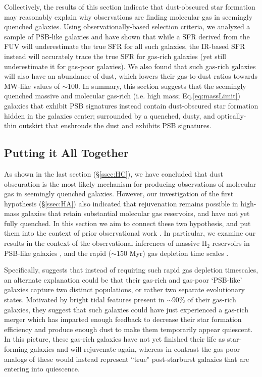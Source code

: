 \documentclass[twocolumn, linenumbers]{aastex631}
\newcommand{\eq}{Eq.\hspace{.2em}}
\begin{document}
Collectively, the results of this section indicate that dust-obscured star formation may reasonably explain why observations are finding molecular gas in seemingly quenched galaxies.  Using observationally-based selection criteria, we analyzed a sample of PSB-like galaxies and have shown that while a SFR derived from the FUV will underestimate the true SFR for all such galaxies, the IR-based SFR instead will accurately trace the true SFR for gas-rich galaxies (yet still underestimate it for gas-poor galaxies).  We also found that such gas-rich galaxies will also have an abundance of dust, which lowers their gas-to-dust ratios towards MW-like values of $\sim 100$.  In summary, this section suggests that the seemingly quenched massive and molecular gas-rich (i.e. high mass; \eq \ref{eq:massLimit}) galaxies that exhibit PSB signatures instead contain dust-obscured star formation hidden in the galaxies center; surrounded by a quenched, dusty, and optically-thin outskirt that enshrouds the dust and exhibits PSB signatures.

\subsection{Putting it All Together}
\label{ssec:allTogether}
As shown in the last section (\S\ref{ssec:HC}), we have concluded that dust obscuration is the most likely mechanism for producing observations of molecular gas in seemingly quenched galaxies.  However, our investigation of the first hypothesis (\S\ref{ssec:HA}) also indicated that rejuvenation remains possible in high-mass galaxies that retain substantial molecular gas reservoirs, and have not yet fully quenched.  In this section we aim to connect these two hypothesis, and put them into the context of prior observational work  \citep{French_2018,Bezanson_2022,setton2025}.  In particular, we examine our results in the context of the observational inferences of massive H$_2$ reservoirs in PSB-like galaxies \citep{suess_2017}, and the rapid ($\sim150$ Myr) gas depletion time scales \citep{Bezanson_2022}.  

Specifically, \cite{setton2025} suggests that instead of requiring such rapid gas depletion timescales, an alternate explanation could be that their gas-rich and gas-poor `PSB-like' galaxies capture two distinct populations, or rather two separate evolutionary states.  Motivated by bright tidal features present in $\sim90\%$ of their gas-rich galaxies, they suggest that such galaxies could have just experienced a gas-rich merger which has imparted enough feedback to decrease their star formation efficiency and produce enough dust to make them temporarily appear quiescent.  In this picture, these gas-rich galaxies have not yet finished their life as star-forming galaxies and will rejuvenate again, whereas in contrast the gas-poor analogs of these would instead represent ``true" post-starburst galaxies that are entering into quiescence.
\end{document}
